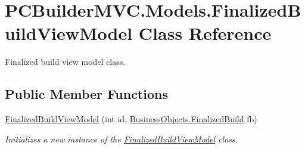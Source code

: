 \hypertarget{class_p_c_builder_m_v_c_1_1_models_1_1_finalized_build_view_model}{}\section{P\+C\+Builder\+M\+V\+C.\+Models.\+Finalized\+Build\+View\+Model Class Reference}
\label{class_p_c_builder_m_v_c_1_1_models_1_1_finalized_build_view_model}


Finalized build view model class.  


\subsection*{Public Member Functions}
\begin{DoxyCompactItemize}
\item 
\hyperlink{class_p_c_builder_m_v_c_1_1_models_1_1_finalized_build_view_model_a2a66b39bc37ebd650493fa5a65c7994e}{Finalized\+Build\+View\+Model} (int id, \hyperlink{class_business_objects_1_1_finalized_build}{Business\+Objects.\+Finalized\+Build} fb)
\begin{DoxyCompactList}\small\item\em Initializes a new instance of the \hyperlink{class_p_c_builder_m_v_c_1_1_models_1_1_finalized_build_view_model}{Finalized\+Build\+View\+Model} class. \end{DoxyCompactList}\end{DoxyCompactItemize}
